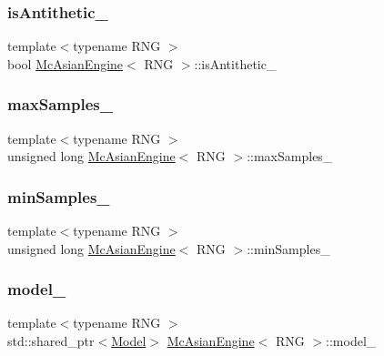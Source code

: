 \subsubsection{\texorpdfstring{is\+Antithetic\+\_\+}{isAntithetic\_}}
{\footnotesize\ttfamily template$<$typename R\+NG $>$ \\
bool \hyperlink{class_mc_asian_engine}{Mc\+Asian\+Engine}$<$ R\+NG $>$\+::is\+Antithetic\+\_\+\hspace{0.3cm}{\ttfamily [private]}}

\hypertarget{class_mc_asian_engine_a512cbb76b5daeb503dc55c2ef72dd74f}{}\label{class_mc_asian_engine_a512cbb76b5daeb503dc55c2ef72dd74f} 
\subsubsection{\texorpdfstring{max\+Samples\+\_\+}{maxSamples\_}}
{\footnotesize\ttfamily template$<$typename R\+NG $>$ \\
unsigned long \hyperlink{class_mc_asian_engine}{Mc\+Asian\+Engine}$<$ R\+NG $>$\+::max\+Samples\+\_\+\hspace{0.3cm}{\ttfamily [private]}}

\hypertarget{class_mc_asian_engine_a71e8848ac19c88cee59590b9cab10700}{}\label{class_mc_asian_engine_a71e8848ac19c88cee59590b9cab10700} 
\subsubsection{\texorpdfstring{min\+Samples\+\_\+}{minSamples\_}}
{\footnotesize\ttfamily template$<$typename R\+NG $>$ \\
unsigned long \hyperlink{class_mc_asian_engine}{Mc\+Asian\+Engine}$<$ R\+NG $>$\+::min\+Samples\+\_\+\hspace{0.3cm}{\ttfamily [private]}}

\hypertarget{class_mc_asian_engine_ae23208fbc0b859e7bfc13821a709c852}{}\label{class_mc_asian_engine_ae23208fbc0b859e7bfc13821a709c852} 
\subsubsection{\texorpdfstring{model\+\_\+}{model\_}}
{\footnotesize\ttfamily template$<$typename R\+NG $>$ \\
std\+::shared\+\_\+ptr$<$\hyperlink{class_model}{Model}$>$ \hyperlink{class_mc_asian_engine}{Mc\+Asian\+Engine}$<$ R\+NG $>$\+::model\+\_\+\hspace{0.3cm}{\ttfamily [private]}}

